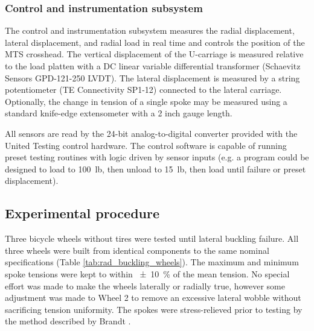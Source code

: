 \documentclass[\rootdir/thesis.tex]{subfiles}
\begin{document}
\subsubsection*{Control and instrumentation subsystem}

The control and instrumentation subsystem measures the radial displacement, lateral displacement, and radial load in real time and controls the position of the MTS crosshead. The vertical displacement of the U-carriage is measured relative to the load platten with a DC linear variable differential transformer (Schaevitz Sensors GPD-121-250 LVDT). The lateral displacement is measured by a string potentiometer (TE Connectivity SP1-12) connected to the lateral carriage. Optionally, the change in tension of a single spoke may be measured using a standard knife-edge extensometer with a 2 inch gauge length.

All sensors are read by the 24-bit analog-to-digital converter provided with the United Testing control hardware. The control software is capable of running preset testing routines with logic driven by sensor inputs (e.g. a program could be designed to load to \SI{100}{lb}, then unload to \SI{15}{lb}, then load until failure or preset displacement).

\subsection{Experimental procedure}

Three bicycle wheels without tires were tested until lateral buckling failure. All three wheels were built from identical components to the same nominal specifications (Table \ref{tab:rad_buckling_wheels}). The maximum and minimum spoke tensions were kept to within \SI{+-10}{\percent} of the mean tension. No special effort was made to make the wheels laterally or radially true, however some adjustment was made to Wheel 2 to remove an excessive lateral wobble without sacrificing tension uniformity. The spokes were stress-relieved prior to testing by the method described by Brandt \cite{Brandt1993}.
\end{document}
